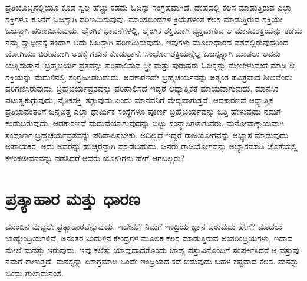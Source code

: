 ಪ್ರತಿಯೊಬ್ಬನಲ್ಲಿಯೂ ಕೂಡ ಸ್ವಲ್ಪ ಹೆಚ್ಚು ಕಡಮೆ ಓಜಸ್ಸು ಸಂಗ್ರಹವಾಗಿದೆ. ದೇಹದಲ್ಲಿ ಕೆಲಸ ಮಾಡುತ್ತಿರುವ ಎಲ್ಲಾ ಶಕ್ತಿಗಳೂ ಕೊನೆಗೆ ಓಜಸ್ಸಾಗಿ ಪರಿಣಮಿಸುವುವು. ಮಾಂಸಖಂಡಗಳ ಕ್ರಿಯೆಗಳಂತೆ ಕೆಲಸ ಮಾಡುತ್ತಿರುವ ಶಕ್ತಿಯೇ ಓಜಸ್ಸಾಗಿ ಪರಿಣಮಿಸುವುದು. ಲೈಂಗಿಕ ಭಾವನೆಗಳಲ್ಲಿ, ಲೈಂಗಿಕ ಶಕ್ತಿಯಾಗಿ ವ್ಯಕ್ತವಾಗುವ ಆ ಮಾನವಶಕ್ತಿಯನ್ನು ತಡೆದು ನಮ್ಮ ಸ್ವಾಧೀನಕ್ಕೆ ತಂದಾಗ ಅದು ಓಜಸ್ಸಾಗಿ ಪರಿಣಮಿಸುವುದು. ಇವುಗಳು ಮೂಲಾಧಾರದ ವಶದಲ್ಲಿರುವುದರಿಂದ ಯೋಗಿಯು ವಿಶೇಷವಾಗಿ ಅದಕ್ಕೆ ಗಮನ ಕೊಡುತ್ತಾನೆ. ಸಂಭೋಗಶಕ್ತಿಯನ್ನೆಲ್ಲ ಓಜಸ್ಸನ್ನಾಗಿ ಮಾಡಲು ಅವನು ಯತ್ನಿಸುತ್ತಾನೆ. ಬ್ರಹ್ಮಚರ್ಯ ವ್ರತವನ್ನು ಪರಿಪಾಲಿಸುವ ಸ್ತ್ರೀ ಮತ್ತು ಪುರುಷರು ಓಜಸ್ಸನ್ನು ಮೇಲೇಳುವಂತೆ ಮಾಡಿ ಆ ಶಕ್ತಿಯನ್ನು ಮೆದುಳಿನಲ್ಲಿ ಸಂಗ್ರಹಿಸಿಡಬಹುದು. ಆದಕಾರಣವೇ ಬ್ರಹ್ಮಚರ್ಯವನ್ನು ಅತ್ಯಂತ ಪವಿತ್ರವಾದ ಶೀಲವೆಂದು ಪರಿಗಣಿಸಿರುವುದು. ಬ್ರಹ್ಮಚರ್ಯವ್ರತವನ್ನು ಪರಿಪಾಲಿಸದೆ ಇದ್ದರೆ ಆಧ್ಯಾತ್ಮಿಕತೆ ಮಾಯವಾಗುವುದು, ಮಾನಸಿಕ ಪಟುತ್ವಕುಗ್ಗುವುದು, ನೈತಿಕಶಕ್ತಿ\break\ ತಗ್ಗುವುದು ಎಂದು ಮಾನವನಿಗೆ ವೇದ್ಯವಾಗುತ್ತದೆ. ಆದಕಾರಣವೆ ಆಧ್ಯಾತ್ಮಿಕ ಪ್ರತಿಭಾವಂತರಿಗೆ ಜನ್ಮವಿತ್ತ ಎಲ್ಲಾ ಧಾರ್ಮಿಕ ಸಂಸ್ಥೆಗಳೂ ಪೂರ್ಣ ಬ್ರಹ್ಮಚರ್ಯವನ್ನು ಒತ್ತಿ ಹೇಳುವುದು ನಮಗೆ ಕಂಡುಬರುವುದು. ಆದಕಾರಣವೆ ಮದುವೆಯಾಗುವುದನ್ನು ಬಿಟ್ಟು ಸಂನ್ಯಾಸಿಗಳಾಗುವರು. ಮನೋವಾಕ್ಕಾಯವಾಗಿ ಸಂಪೂರ್ಣ ಬ್ರಹ್ಮಚರ್ಯವ್ರತವನ್ನು ಪರಿಪಾಲಿಸಬೇಕು. ಅದಿಲ್ಲದೆ ಇದ್ದರೆ ರಾಜಯೋಗವನ್ನು ಅಭ್ಯಾಸ ಮಾಡುವುದು ಅಪಾಯಕರ. ಅದು ಅವರನ್ನು ಹುಚ್ಚರನ್ನಾಗಿ ಮಾಡಬಹುದು. ಜನರು ರಾಜಯೋಗವನ್ನು ಅಭ್ಯಾಸಮಾಡಿ ಜೊತೆಯಲ್ಲಿ ಕಳಂಕಜೀವನವನ್ನು ನಡೆಸಿದರೆ ಅವರು ಯೋಗಿಗಳು ಹೇಗೆ ಆಗಬಲ್ಲರು?

\chapter{ಪ್ರತ್ಯಾಹಾರ ಮತ್ತು ಧಾರಣ}

ಮುಂದಿನ ಮೆಟ್ಟಲೇ ಪ್ರತ್ಯಾಹಾರವೆನ್ನುವುದು. ಇದೇನು? ನಿಮಗೆ ಇಂದ್ರಿಯ ಜ್ಞಾನ ಬರುವುದು ಹೇಗೆ? ಮೊದಲು ಬಾಹ್ಯೇಂದ್ರಿಯಗಳಿವೆ, ಅನಂತರ ಮಿದುಳಿನ ಕೇಂದ್ರಗಳ ಮೂಲಕ ಕೆಲಸ ಮಾಡುತ್ತಿರುವ ಅಂತರಿಂದ್ರಿಯಗಳು, ಇದಾದ ಮೇಲೆ ಮನಸ್ಸು ಇರುವುದು. ಇವು ಕಲೆತು ಯಾವುದಾದರೊಂದು ಬಾಹ್ಯ ವಸ್ತುವಿನೊಂದಿಗೆ ಸಂಪರ್ಕಿಸಿದರೆ ಆ ವಸ್ತುವು ನಮಗೆ ಕಾಣುತ್ತದೆ. ಮನಸ್ಸನ್ನು ಏಕಾಗ್ರಮಾಡಿ ಒಂದೇ ಇಂದ್ರಿಯದ ಕಡೆ ಬಿಡುವುದು ಬಹಳ ಕಷ್ಟವಾದ ಕೆಲಸ. ಮನಸ್ಸು ಒಂದು ಗುಲಾಮನಂತೆ. 

\vskip 6pt

